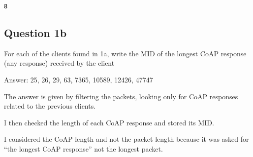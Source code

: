 \documentclass[11pt]{article}
\makeatletter
\newcommand{\boxspacing}{\kern\kvtcb@left@rule\kern\kvtcb@boxsep}
\newcommand{\prompt}[4]{
        {\ttfamily\llap{{\color{#2}[#3]:\hspace{3pt}#4}}\vspace{-\baselineskip}}
    }
\makeatother
\begin{document}
            \begin{tcolorbox}[breakable, size=fbox, boxrule=.5pt, pad at break*=1mm, opacityfill=0]
\prompt{Out}{outcolor}{6}{\boxspacing}
\begin{Verbatim}[commandchars=\\\{\}]
8
\end{Verbatim}
\end{tcolorbox}
        
    \hypertarget{question-1b}{%
\subsection{Question 1b}\label{question-1b}}

For each of the clients found in 1a, write the MID of the longest CoAP
response (any response) received by the client

Answer: 25, 26, 29, 63, 7365, 10589, 12426, 47747

The answer is given by filtering the packets, looking only for CoAP
responses related to the previous clients.

I then checked the length of each CoAP response and stored its MID.

I considered the CoAP length and not the packet length because it was
asked for ``the longest CoAP response'' not the longest packet.
\end{document}
